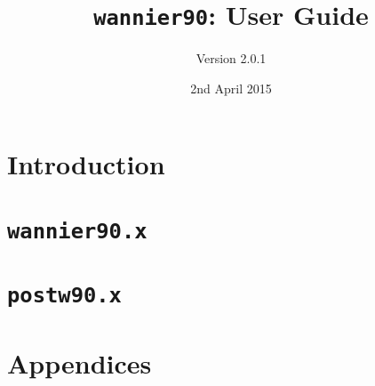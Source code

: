 \documentclass[a4paper,11pt,twoside]{book}
\title{{\tt wannier90}: User Guide}
\author{Version 2.0.1}
\date{2nd April 2015}
\begin{document}
\newcommand{\wannier}{\texttt{wannier90}}
\newcommand{\postw}{\texttt{postw90}}
\newcommand{\bw}{\texttt{BoltzWann}}
\newcommand{\pwscf}{\textsc{pwscf}}
\newcommand{\QE}{\textsc{quantum-espresso}}
\newcommand{\Mkb}{\mathbf{M}^{(\mathbf{k},\mathbf{b})}}
\newcommand{\Ak}{\mathbf{A}^{(\mathbf{k})}}
\newcommand{\Uk}{\mathbf{U}^{(\mathbf{k})}}
\newcommand{\cond}{\item[$\star$]}
\newcommand{\omi}{\Omega_{\mathrm{I}}}
\newcommand{\omt}{\widetilde{\Omega}}
\newcommand{\bvec}[1]{\bm{\mathrm{#1}}}

\maketitle

\tableofcontents



\part{Introduction}



\part{\texttt{wannier90.x}\label{part:w90}}



















\part{\texttt{postw90.x}}









\appendix
\part{Appendices}





%



\end{document}
